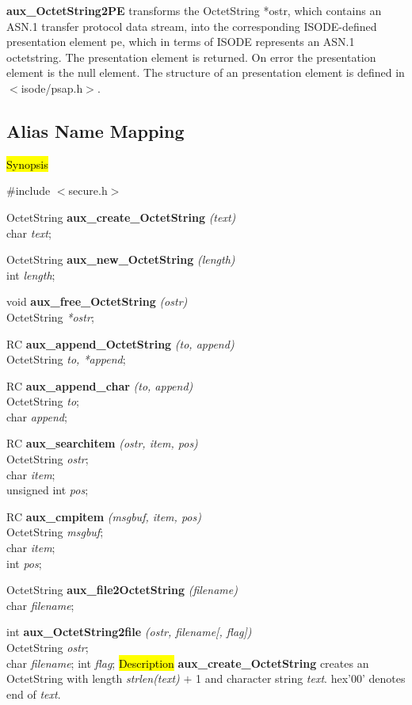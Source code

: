 {\bf aux\_OctetString2PE}
transforms the OctetString *ostr, which contains an ASN.1 transfer
protocol data stream, into
the corresponding ISODE-defined presentation element pe, which
in terms of ISODE represents an ASN.1 octetstring.
The presentation element is returned.
On error the presentation element is the null element.
The structure of an presentation element is defined in $<$isode/psap.h$>$.

\subsection{Alias Name Mapping}
\label{aux_ostringhand}
\hl{Synopsis}

\#include $<$secure.h$>$
 
OctetString {\bf *aux\_create\_OctetString} {\em (text)} \\
char {\em *text};

OctetString {\bf *aux\_new\_OctetString} {\em (length)} \\
int {\em length};

void {\bf aux\_free\_OctetString} {\em (ostr)} \\
OctetString {\em **ostr};

RC {\bf aux\_append\_OctetString} {\em (to, append)} \\
OctetString {\em *to, *append};

RC {\bf aux\_append\_char} {\em (to, append)} \\
OctetString {\em *to};    \\
char {\em *append};

RC {\bf aux\_searchitem} {\em (ostr, item, pos)} \\
OctetString {\em *ostr};    \\
char {\em *item};    \\
unsigned int {\em *pos};

RC {\bf *aux\_cmpitem} {\em (msgbuf, item, pos)}  \\
OctetString {\em *msgbuf};    \\
char {\em *item};    \\
int {\em pos};

OctetString {\bf *aux\_file2OctetString} {\em (filename)} \\
char {\em *filename};

int {\bf aux\_OctetString2file} {\em (ostr, filename[, flag])} \\
OctetString {\em *ostr};    \\
char {\em *filename};
int {\em flag};
\hl{Description}
{\bf aux\_create\_OctetString} creates an OctetString with length {\em strlen(text)} $+$ 1
and character string {\em text}.
hex'00' denotes end of {\em text}.

